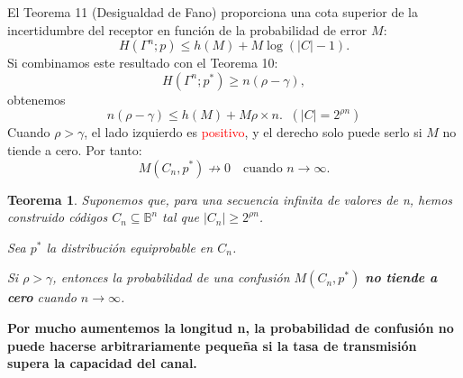 \documentclass{beamer}
\theoremstyle{plain}
\newtheorem{teorema} [Teorema] {Teorema}
\theoremstyle{example}
\newtheorem{ejercicio} [Ejercicio]{Ejercicio}
\theoremstyle{example}
\begin{document}
\begin{frame}  \footnotesize  


El Teorema 11 (Desigualdad de Fano) proporciona una cota superior
de la incertidumbre del receptor en función de la probabilidad de error $M$:
\[
H(\Gamma^n; p) \le h(M) + M \log(|C| - 1).
\]
Si combinamos este resultado con el Teorema 10:
\[
H(\Gamma^n; p^*) \ge n(\rho - \gamma),
\]
obtenemos
\[
n(\rho - \gamma) \le h(M) + M \rho \times n. \;\;(|C| = 2^{\rho n})
\]
Cuando $\rho > \gamma$, el lado izquierdo es \textcolor{red}{positivo}, y el derecho
solo puede serlo si $M$ no tiende a cero. Por tanto:
\[
M(C_n, p^*) \not\to 0 \quad \text{cuando } n \to \infty.
\]


\begin{teorema}

Suponemos  que, para una secuencia infinita de valores de n, hemos construido códigos $C_n \subseteq \mathbb{B}^n$ tal que  $|C_n| \geqslant 2^{\rho n}$. 
\vspace{0.2cm} 

Sea $p^*$ la distribución equiprobable en $C_n$. 
 
\vspace{0.2cm} 
 
Si $\rho > \gamma$, entonces la probabilidad de una confusión $M(C_n,p^*)$ \textbf{no tiende a cero} cuando $n \rightarrow \infty$.
\end{teorema}

\textbf{Por mucho aumentemos la longitud n, la probabilidad de confusión no puede hacerse arbitrariamente pequeña si la tasa de transmisión supera la capacidad del canal.
}

\end{frame} 



\end{document}
